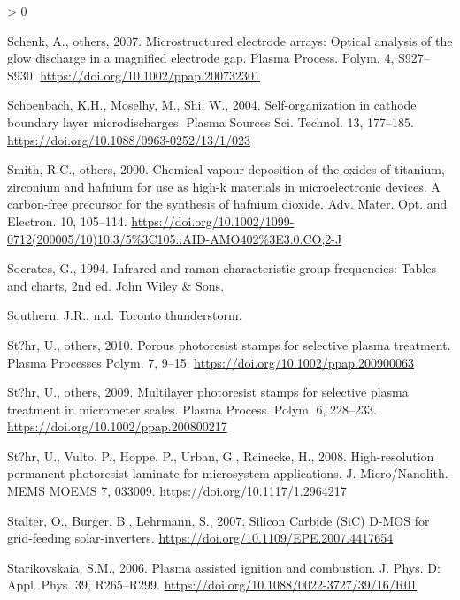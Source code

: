 \documentclass[
  11pt,
  twoside]{article}
\newlength{\cslhangindent}
\newenvironment{CSLReferences}[2] %
 {%
  \setlength{\parindent}{0pt}
  \ifodd #1 \everypar{\setlength{\hangindent}{\cslhangindent}}\ignorespaces\fi
  \ifnum #2 > 0
  \setlength{\parskip}{#2\baselineskip}
  \fi
 }%
 {}
\begin{document}
\begin{CSLReferences}{1}{0}
\leavevmode\hypertarget{ref-Sche07}{}%
Schenk, A., others, 2007. Microstructured electrode arrays: Optical analysis of the glow discharge in a magnified electrode gap. Plasma Process. Polym. 4, S927--S930. \url{https://doi.org/10.1002/ppap.200732301}

\leavevmode\hypertarget{ref-Scho04}{}%
Schoenbach, K.H., Moselhy, M., Shi, W., 2004. Self-organization in cathode boundary layer microdischarges. Plasma Sources Sci. Technol. 13, 177--185. \url{https://doi.org/10.1088/0963-0252/13/1/023}

\leavevmode\hypertarget{ref-Smit00}{}%
Smith, R.C., others, 2000. Chemical vapour deposition of the oxides of titanium, zirconium and hafnium for use as high-k materials in microelectronic devices. A carbon-free precursor for the synthesis of hafnium dioxide. Adv. Mater. Opt. and Electron. 10, 105--114. \url{https://doi.org/10.1002/1099-0712(200005/10)10:3/5\%3C105::AID-AMO402\%3E3.0.CO;2-J}

\leavevmode\hypertarget{ref-Socr1994}{}%
Socrates, G., 1994. Infrared and raman characteristic group frequencies: Tables and charts, 2nd ed. John Wiley \& Sons.

\leavevmode\hypertarget{ref-Lightning}{}%
Southern, J.R., n.d. Toronto thunderstorm.

\leavevmode\hypertarget{ref-Stoe10}{}%
St?hr, U., others, 2010. Porous photoresist stamps for selective plasma treatment. Plasma Processes Polym. 7, 9--15. \url{https://doi.org/10.1002/ppap.200900063}

\leavevmode\hypertarget{ref-Stoe09}{}%
St?hr, U., others, 2009. Multilayer photoresist stamps for selective plasma treatment in micrometer scales. Plasma Process. Polym. 6, 228--233. \url{https://doi.org/10.1002/ppap.200800217}

\leavevmode\hypertarget{ref-Stoe08}{}%
St?hr, U., Vulto, P., Hoppe, P., Urban, G., Reinecke, H., 2008. High-resolution permanent photoresist laminate for microsystem applications. J. Micro/Nanolith. MEMS MOEMS 7, 033009. \url{https://doi.org/10.1117/1.2964217}

\leavevmode\hypertarget{ref-Stal07}{}%
Stalter, O., Burger, B., Lehrmann, S., 2007. {Silicon Carbide (SiC) D-MOS for grid-feeding solar-inverters}. \url{https://doi.org/10.1109/EPE.2007.4417654}

\leavevmode\hypertarget{ref-Star06}{}%
Starikovskaia, S.M., 2006. Plasma assisted ignition and combustion. J. Phys. D: Appl. Phys. 39, R265--R299. \url{https://doi.org/10.1088/0022-3727/39/16/R01}


\end{CSLReferences}
\end{document}
